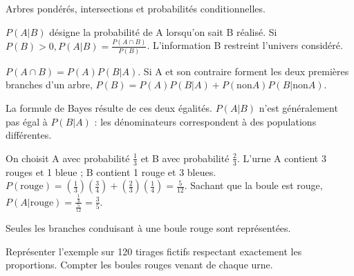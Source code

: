 \documentclass[11pt]{article}
\begin{document}
Arbres pondérés, intersections et probabilités conditionnelles.\par
{}
\(P(A|B)\) désigne la probabilité de A lorsqu’on sait B réalisé. Si \(P(B) > 0, P(A|B) = \frac{P(A \cap  B)}{P(B)}\). L’information B restreint l’univers considéré.\par
\(P(A \cap  B) = P(A)P(B|A)\). Si A et son contraire forment les deux premières branches d’un arbre, \(P(B) = P(A)P(B|A) + P(\mathrm{non} A)P(B|\mathrm{non} A)\).\par
La formule de Bayes résulte de ces deux égalités. \(P(A|B)\) n’est généralement pas égal à \(P(B|A)\) : les dénominateurs correspondent à des populations différentes.\par
{}
On choisit A avec probabilité \(\frac{1}{3}\) et B avec probabilité \(\frac{2}{3}\). L’urne A contient 3 rouges et 1 bleue ; B contient 1 rouge et 3 bleues. \(P(\mathrm{rouge}) = (\frac{1}{3})(\frac{3}{4}) + (\frac{2}{3})(\frac{1}{4}) = \frac{5}{12}\). Sachant que la boule est rouge, \(P(A|\mathrm{rouge}) = \frac{\frac{1}{4}}{\frac{5}{12}} = \frac{3}{5}\).\par
\begin{center}\end{center}
Seules les branches conduisant à une boule rouge sont représentées.\par
{}
Représenter l’exemple sur 120 tirages fictifs respectant exactement les proportions. Compter les boules rouges venant de chaque urne.\par
\end{document}
